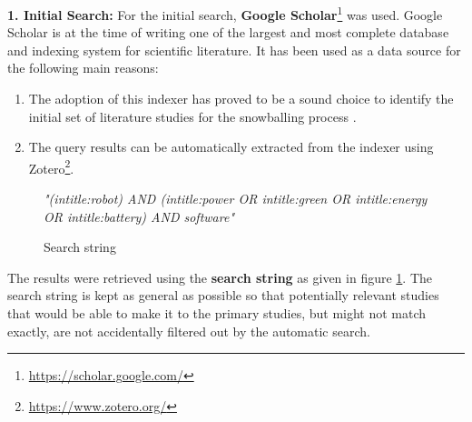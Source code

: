 \noindent\textbf{1. Initial Search:}
For the initial search, \textbf{Google Scholar}\footnote{\url{https://scholar.google.com/}} was used. 
Google Scholar is at the time of writing one of the largest and most complete database and indexing system for scientific literature.
It has been used as a data source for the following main reasons:
\begin{enumerate}
    \item The adoption of this indexer has proved to be a sound choice to identify the initial set 
    of literature studies for the snowballing process \cite{wohlin2014snowballing}.
    \item The query results can be automatically extracted from the indexer using Zotero\footnote{\url{https://www.zotero.org/}}.
\end{enumerate}

\begin{figure}
    \centering
    \textit{"(intitle:robot) AND (intitle:power OR intitle:green OR intitle:energy OR intitle:battery) AND software"}
    \caption{Search string}
    \label{fig:search_string}
\end{figure}

The results were retrieved using the \textbf{search string} as given in figure \ref{fig:search_string}. 
The search string is kept as general as possible so that potentially relevant studies that would be able to make it 
to the primary studies, but might not match exactly, are not accidentally filtered out by the automatic search.

